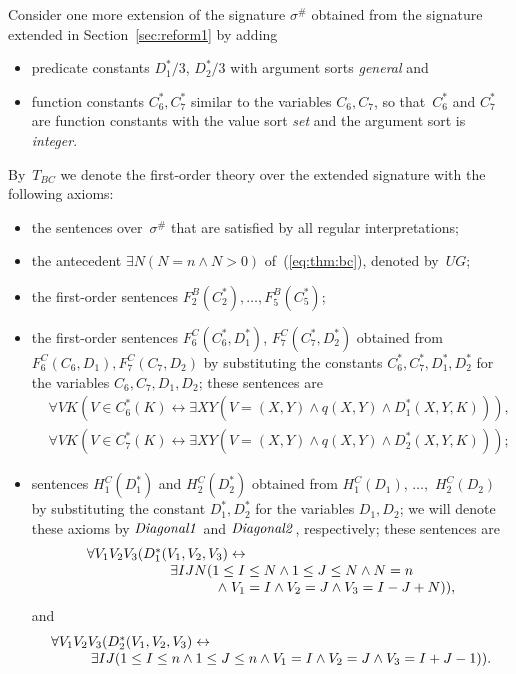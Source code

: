 \documentclass[11pt]{article}
\def\ug{\mathit{UG}}
\def\lrar{\leftrightarrow}
\def\beq{\begin{equation}}
\def\eeq#1{\label{#1}\end{equation}}
\def\ba{\begin{array}}
\def\ea{\end{array}}
\def\diagO{\mathit{Diagonal1\/}}
\def\diagT{\mathit{Diagonal2\/}}
\begin{document}
\begin{adjustwidth}{-1cm}{-1cm}
Consider one more extension of the signature $\sigma^\#$ obtained 
from the signature extended in Section~\ref{sec:reform1}
by adding 
\begin{itemize}
\item predicate
constants $D^*_1/3$, $D^*_2/3$ with argument sorts {\em general}
and 
\item function constants
$C_6^*,C_7^*$ similar to the variables 
$C_6,C_7$, so that~$C_6^*$ and $C_7^*$ are function constants with 
 the value sort \emph{set} and the argument sort is {\em integer}.
\end{itemize}    
By~$T_{BC}$ we denote the
first-order theory over the extended signature 
with the following axioms:
\begin{itemize}
\item the sentences over~$\sigma^\#$ that are satisfied by all regular
  interpretations;
\item the antecedent $\exists N(N=n\land N>0)$ of~(\ref{eq:thm:bc}),
  denoted by~$\ug$;
\item the first-order sentences $F^B_2(C^*_2),\dots,F^B_5(C^*_5)$;
\item the first-order sentences  $F^C_6(C^*_6,D^*_1)$, $F^C_7(C^*_7,D^*_2)$ 
  obtained from $F^C_6(C_6,D_1),F^C_7(C_7,D_2)$ by
  substituting the constants $C^*_6,C^*_7,D^*_1,D^*_2$ for the variables
  $C_6,C_7,D_1,D_2$; these sentences are
\begin{align}
&\forall VK(V\in C^*_6(K) \lrar \exists XY(V=(X,Y) \land q(X,Y) \land D^*_1(X,Y,K))),\label{dd6}\\
&\forall VK(V\in C^*_7(K) \lrar \exists XY(V=(X,Y) \land q(X,Y) \land D^*_2(X,Y,K)))\label{dd7};
\end{align}
\item sentences
 $H^C_1(D^*_1)$ and $H^C_2(D^*_2)$
 obtained from $H^C_1(D_1)$, $\dots,$ $H^C_2(D_2)$ by
  substituting the constant
 $D^*_1,D^*_2$ for the variables $D_1,D_2$; we will denote these axioms by $\diagO$ and $\diagT$, respectively; these sentences are
 \beq
\ba l
\forall V_1V_2V_3( D^*_1(V_1,V_2,V_3)\lrar\\
\hskip 21mm
\exists I J  N(1\leq I\leq N \land 1\leq J\leq N \land N=n \\
\hskip 33mm
\land\; V_1=I\land V_2=J \land V_3= I-J+N)),
\ea
\eeq{c4fcdefV*}
and
\beq
\ba l\forall V_1V_2V_3(D^*_2(V_1,V_2,V_3)\lrar \\
\hskip 10mm
\exists I J  (1\leq I\leq n \land 1\leq J\leq n 
\land V_1=I \land V_2=J \land V_3= I+J-1)).
\ea
\eeq{c5fcdefV*}
\end{itemize}



\end{adjustwidth}
\end{document}
